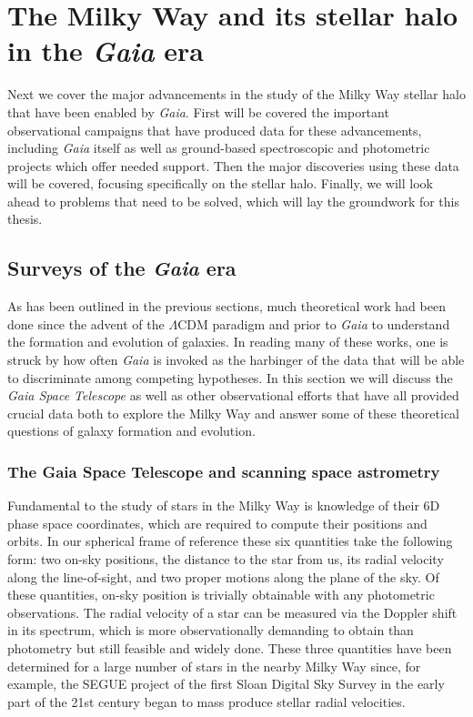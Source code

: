 
\section{The Milky Way and its stellar halo in the \textit{Gaia} era}

Next we cover the major advancements in the study of the Milky Way stellar halo that have been enabled by \textit{Gaia}. First will be covered the important observational campaigns that have produced data for these advancements, including \textit{Gaia} itself as well as ground-based spectroscopic and photometric projects which offer needed support. Then the major discoveries using these data will be covered, focusing specifically on the stellar halo. Finally, we will look ahead to problems that need to be solved, which will lay the groundwork for this thesis.

\subsection{Surveys of the \textit{Gaia} era}

As has been outlined in the previous sections, much theoretical work had been done since the advent of the $\Lambda$CDM paradigm and prior to \textit{Gaia} to understand the formation and evolution of galaxies. In reading many of these works, one is struck by how often \textit{Gaia} is invoked as the harbinger of the data that will be able to discriminate among competing hypotheses. In this section we will discuss the \textit{Gaia Space Telescope} as well as other observational efforts that have all provided crucial data both to explore the Milky Way and answer some of these theoretical questions of galaxy formation and evolution.

\subsubsection{The Gaia Space Telescope and scanning space astrometry}

Fundamental to the study of stars in the Milky Way is knowledge of their 6D phase space coordinates, which are required to compute their positions and orbits. In our spherical frame of reference these six quantities take the following form: two on-sky positions, the distance to the star from us, its radial velocity along the line-of-sight, and two proper motions along the plane of the sky. Of these quantities, on-sky position is trivially obtainable with any photometric observations. The radial velocity of a star can be measured via the Doppler shift in its spectrum, which is more observationally demanding to obtain than photometry but still feasible and widely done. These three quantities have been determined for a large number of stars in the nearby Milky Way since, for example, the SEGUE project \parencite{segue} of the first Sloan Digital Sky Survey \parencite[SDSS;][]{sdss} in the early part of the 21st century began to mass produce stellar radial velocities.

